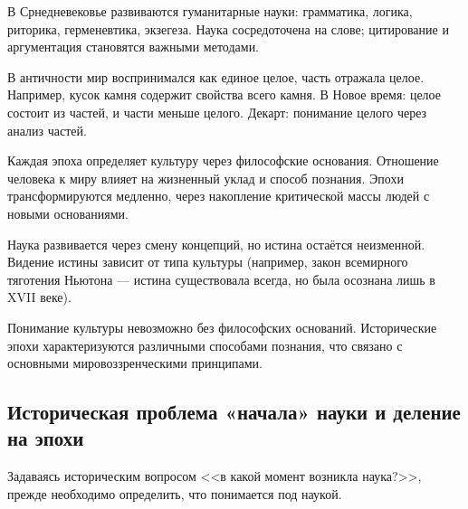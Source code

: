 В Срнедневековье развиваются гуманитарные науки: грамматика, логика, риторика, герменевтика, экзегеза. Наука сосредоточена на слове; цитирование и аргументация становятся важными методами.

В античности мир воспринимался как единое целое, часть отражала целое. Например, кусок камня содержит свойства всего камня. В Новое время: целое состоит из частей, и части меньше целого. Декарт: понимание целого через анализ частей.

Каждая эпоха определяет культуру через философские основания. Отношение человека к миру влияет на жизненный уклад и способ познания. Эпохи трансформируются медленно, через накопление критической массы людей с новыми основаниями.

Наука развивается через смену концепций, но истина остаётся неизменной. Видение истины зависит от типа культуры (например, закон всемирного тяготения Ньютона --- истина существовала всегда, но была осознана лишь в XVII веке).

Понимание культуры невозможно без философских оснований. Исторические эпохи характеризуются различными способами познания, что связано с основными мировоззренческими принципами.

\subsection{Историческая проблема «начала» науки и деление на эпохи}

Задаваясь историческим вопросом <<в какой момент возникла наука?>>, прежде
необходимо определить, что понимается под наукой.



